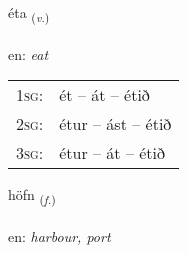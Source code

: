 \documentclass[frontgrid, backgrid]{flacards}\usepackage[]{graphicx}\usepackage[]{color}
\begin{document}
\renewcommand{\flhead}{\vskip5pt \fboxsep=0pt {\small\bfseries\footnotesize Sagnorð | Verb}}
\renewcommand{\fcfoot}{\vskip5pt \fboxsep=0pt \hspace{2pt}{\small\bfseries\footnotesize 2K}}

\renewcommand{\blhead}{\vskip5pt {\small\bfseries\footnotesize Sagnorð | Verb }}
\renewcommand{\bcfoot}{\vskip5pt \hspace{2pt}{\small\bfseries\footnotesize 2K}}


{éta \small{\textsubscript{(\textit{v.})}} \\[1ex] %
\textphonetic{[jɛːta]} \\
en: \emph{eat} \\  [2ex]
\renewcommand*{\arraystretch}{0.8}
\begin{tabular}{p{1cm}l}
\textsc{1sg}: & ét -- át -- étið \\ 
\textsc{2sg}: & étur -- ást -- étið \\ 
\textsc{3sg}: & étur -- át -- étið \\ 
\end{tabular}
}

\renewcommand{\flhead}{\vskip5pt \fboxsep=0pt {\small\bfseries\footnotesize Nafnorð | Noun}}
\renewcommand{\fcfoot}{\vskip5pt \fboxsep=0pt \hspace{2pt}{\small\bfseries\footnotesize 2K}}

\renewcommand{\blhead}{\vskip5pt {\small\bfseries\footnotesize Nafnorð | Noun }}
\renewcommand{\bcfoot}{\vskip5pt \hspace{2pt}{\small\bfseries\footnotesize 2K}}


{höfn \small{\textsubscript{(\textit{f.})}} \\[1ex] %
\textphonetic{[hœpn̥]} \\
en: \emph{harbour, port} \\  [2ex]
\renewcommand*{\arraystretch}{0.8}
}
\end{document}
